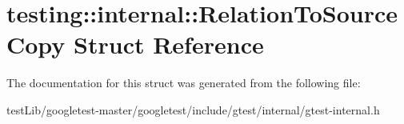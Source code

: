 \hypertarget{structtesting_1_1internal_1_1RelationToSourceCopy}{}\section{testing\+:\+:internal\+:\+:Relation\+To\+Source\+Copy Struct Reference}
\label{structtesting_1_1internal_1_1RelationToSourceCopy}


The documentation for this struct was generated from the following file\+:\begin{DoxyCompactItemize}
\item 
test\+Lib/googletest-\/master/googletest/include/gtest/internal/gtest-\/internal.\+h\end{DoxyCompactItemize}
